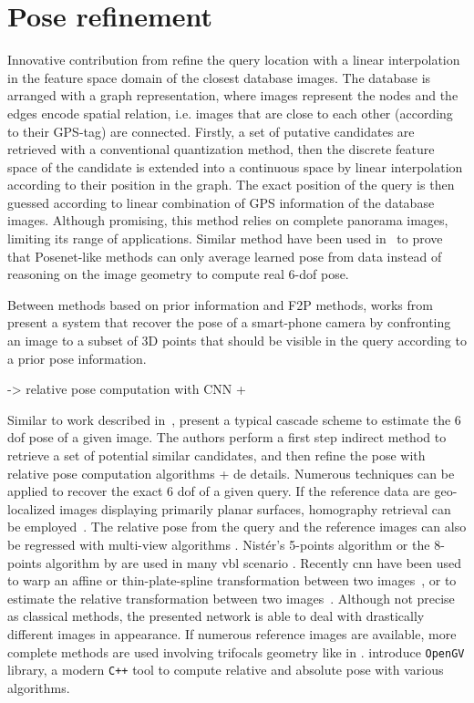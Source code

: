 \section{Pose refinement}

Innovative contribution from \citet{Torii2011} refine the query location with a linear interpolation in the feature space domain of the closest database images. The database is arranged with a graph representation, where images represent the nodes and the edges encode spatial relation, i.e. images that are close to each other (according to their GPS-tag) are connected. Firstly, a set of putative candidates are retrieved with a conventional quantization method, then the discrete feature space of the candidate is extended into a continuous space by linear interpolation according to their position in the graph. The exact position of the query is then guessed according to linear combination of GPS information of the database images. Although promising, this method relies on complete panorama images, limiting its range of applications. Similar method have been used in~\citep{Sattler2019} to prove that Posenet-like methods can only average learned pose from data instead of reasoning on the image geometry to compute real 6-\ac{dof} pose.


Between methods based on prior information and F2P methods, works from \citet{Arth2009} present a system that recover the pose of a smart-phone camera by confronting an image to a subset of 3D points that should be visible in the query according to a prior pose information.

\citep{Li2019} -> relative pose computation with CNN + \citep{Rocco2018}

Similar to work described in~\citep{Rubio2015,Sattler2017}, \citet{Song2016} present a typical cascade scheme to estimate the 6 \ac{dof} pose of a given image. The authors perform a first step indirect method to retrieve a set of potential similar candidates, and then refine the pose with relative pose computation algorithms + de details. 
\label{para:pose_compute}
Numerous techniques can be applied to recover the exact 6 \ac{dof} of a given query. If the reference data are geo-localized images displaying primarily planar surfaces, homography retrieval can be employed~\citep{Forstner2016}. The relative pose from the query and the reference images can also be regressed with multi-view algorithms \citep{Hartley2003}. Nist\'er's 5-points algorithm \citep{Nister2004} or the 8-points algorithm by \citet{Hartley1997} are used in many \ac{vbl} scenario \citep{Qu2016}. Recently \ac{cnn} have been used to warp an affine or thin-plate-spline transformation between two images~\citep{Rocco2017}, or to estimate the relative transformation between two images~\citep{Melekhova}. Although not precise as classical methods, the presented network is able to deal with drastically different images in appearance. If numerous reference images are available, more complete methods are used involving trifocals geometry \citep{Hartley2003} like in \citep{Song2016}. \citet{Kneip2014opengv} introduce \texttt{OpenGV} library, a modern \texttt{C++} tool to compute relative and absolute pose with various algorithms.

